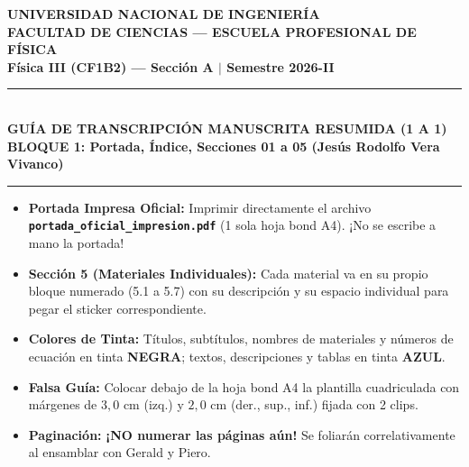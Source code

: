 \documentclass[a4paper, 11pt]{article}
\begin{document}
\begin{center}
    {\large\bfseries UNIVERSIDAD NACIONAL DE INGENIERÍA}\\[0.08cm]
    {\normalsize\bfseries FACULTAD DE CIENCIAS --- ESCUELA PROFESIONAL DE FÍSICA}\\[0.08cm]
    {\footnotesize\textbf{Física III (CF1B2) --- Sección A \quad $\vert$ \quad Semestre 2026-II}}\\[0.15cm]
    \rule{\linewidth}{1.0pt}\\[0.12cm]
    {\Large\bfseries\color{uni-blue} GUÍA DE TRANSCRIPCIÓN MANUSCRITA RESUMIDA (1 A 1)}\\[0.08cm]
    {\large\bfseries BLOQUE 1: Portada, Índice, Secciones 01 a 05 (Jesús Rodolfo Vera Vivanco)}\\[0.12cm]
    \rule{\linewidth}{1.0pt}
\end{center}

\vspace{-0.2cm}

\begin{tcolorbox}[title=Estructura y Reglas Clave para la Escritura a Mano, colframe=uni-blue]
    \footnotesize
    \begin{itemize}[leftmargin=1.3em, itemsep=2pt]
        \item \textbf{Portada Impresa Oficial:} Imprimir directamente el archivo \textbf{\texttt{portada\_oficial\_impresion.pdf}} (1 sola hoja bond A4). ¡No se escribe a mano la portada!
        \item \textbf{Sección 5 (Materiales Individuales):} Cada material va en su propio bloque numerado (5.1 a 5.7) con su descripción y su espacio individual para pegar el sticker correspondiente.
        \item \textbf{Colores de Tinta:} Títulos, subtítulos, nombres de materiales y números de ecuación en tinta \textbf{NEGRA}; textos, descripciones y tablas en tinta \textbf{AZUL}.
        \item \textbf{Falsa Guía:} Colocar debajo de la hoja bond A4 la plantilla cuadriculada con márgenes de $3{,}0\text{ cm}$ (izq.) y $2{,}0\text{ cm}$ (der., sup., inf.) fijada con 2 clips.
        \item \textbf{Paginación:} \textbf{¡NO numerar las páginas aún!} Se foliarán correlativamente al ensamblar con Gerald y Piero.
    \end{itemize}
\end{tcolorbox}
\end{document}
